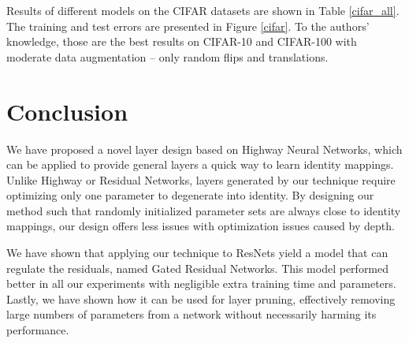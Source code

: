 \documentclass{article} %
\begin{document}
Results of different models on the CIFAR datasets are shown in Table \ref{cifar_all}. The training and test errors are presented in Figure \ref{cifar}. To the authors' knowledge, those are the best results on CIFAR-10 and CIFAR-100 with moderate data augmentation -- only random flips and translations.


















\section{Conclusion}

We have proposed a novel layer design based on Highway Neural Networks, which can be applied to provide general layers a quick way to learn identity mappings. Unlike Highway or Residual Networks, layers generated by our technique require optimizing only one parameter to degenerate into identity. By designing our method such that randomly initialized parameter sets are always close to identity mappings, our design offers less issues with optimization issues caused by depth.

We have shown that applying our technique to ResNets yield a model that can regulate the residuals, named Gated Residual Networks. This model performed better in all our experiments with negligible extra training time and parameters. Lastly, we have shown how it can be used for layer pruning, effectively removing large numbers of parameters from a network without necessarily harming its performance.






















\end{document}
